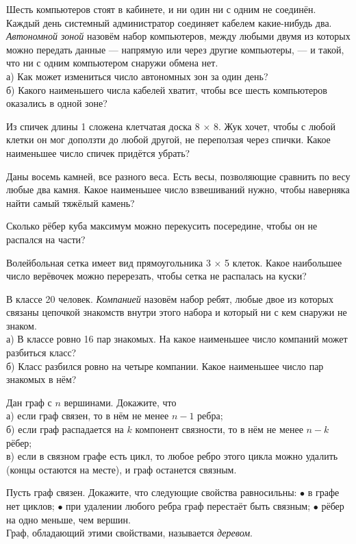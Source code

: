 \problem Шесть компьютеров стоят в кабинете, и ни один ни с одним не соединён. Каждый день системный администратор соединяет кабелем какие-нибудь два. \textit{Автономной зоной} назовём набор компьютеров, между любыми двумя из которых можно передать данные — напрямую или через другие компьютеры, — и такой, что ни с одним компьютером снаружи обмена нет.\\
а) Как может измениться число автономных зон за один день?\\
б) Какого наименьшего числа кабелей хватит, чтобы все шесть компьютеров оказались в одной зоне?

\problem Из спичек длины 1 сложена клетчатая доска 8 $\times$ 8. Жук хочет, чтобы с любой клетки он мог доползти до любой другой, не переползая через спички. Какое наименьшее число спичек придётся убрать?

\problem Даны восемь камней, все разного веса. Есть весы, позволяющие сравнить по весу любые два камня. Какое наименьшее число взвешиваний нужно, чтобы наверняка найти самый тяжёлый камень?

\problem Сколько рёбер куба максимум можно перекусить посередине, чтобы он не распался на части?

\problem Волейбольная сетка имеет вид прямоугольника 3 $\times$ 5 клеток. Какое наибольшее число верёвочек можно перерезать, чтобы сетка не распалась на куски?

\problem В классе 20 человек. \textit{Компанией} назовём набор ребят, любые двое из которых связаны цепочкой знакомств внутри этого набора и который ни с кем снаружи не знаком.\\
а) В классе ровно 16 пар знакомых. На какое наименьшее число компаний может разбиться класс?\\
б) Класс разбился ровно на четыре компании. Какое наименьшее число пар знакомых в нём?

\problem Дан граф с $n$ вершинами. Докажите, что\\
а) если граф связен, то в нём не менее $n-1$ ребра;\\
б) если граф распадается на $k$ компонент связности, то в нём не менее $n-k$ рёбер;\\
в) если в связном графе есть цикл, то любое ребро этого цикла можно удалить (концы остаются на месте), и граф останется связным.

\problem Пусть граф связен. Докажите, что следующие свойства равносильны: $\bullet$ в графе нет циклов; $\bullet$ при удалении любого ребра граф перестаёт быть связным; $\bullet$ рёбер на одно меньше, чем вершин.\\
Граф, обладающий этими свойствами, называется \textit{деревом}.

